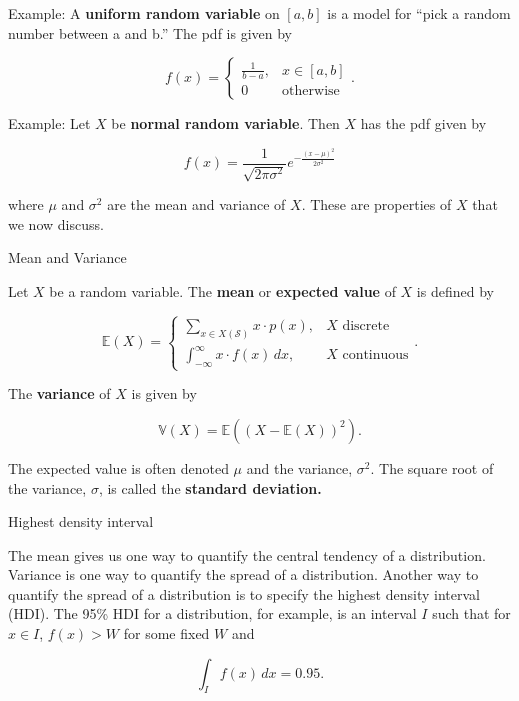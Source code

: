 \documentclass[ignorenonframetext,aspectratio=169]{beamer}
\begin{document}
\begin{frame}{}
\protect\hypertarget{section-1}{}

Example: A \textbf{uniform random variable} on \([a,b]\) is a model for
``pick a random number between a and b.'' The pdf is given by

\[f(x) = 
  \begin{cases} 
    \frac{1}{b-a}, & x\in[a,b] \\ 
    0 & \text{otherwise}
  \end{cases}.
\]

Example: Let \(X\) be \textbf{normal random variable}. Then \(X\) has
the pdf given by

\[f(x) = \frac{1}{\sqrt{2\pi\sigma^2}}e^{-\frac{(x-\mu)^2}{2\sigma^2}}\]

where \(\mu\) and \(\sigma^2\) are the mean and variance of \(X\). These
are properties of \(X\) that we now discuss.

\end{frame}

\begin{frame}{Mean and Variance}
\protect\hypertarget{mean-and-variance}{}

Let \(X\) be a random variable. The \textbf{mean} or \textbf{expected
value} of \(X\) is defined by

\[\mathbb E(X)=
  \begin{cases}
    \displaystyle\sum_{x\in X(\mathcal S)}x\cdot p(x), & X \text{   discrete} \\
    \displaystyle\int_{-\infty}^{\infty}x\cdot f(x)\, dx, & X \text{   continuous}
  \end{cases}
.\]

The \textbf{variance} of \(X\) is given by

\[\mathbb V(X)=\mathbb E\left((X - \mathbb E(X))^2\right).\]

The expected value is often denoted \(\mu\) and the variance,
\(\sigma^2\). The square root of the variance, \(\sigma\), is called the
\textbf{standard deviation.}

\end{frame}

\begin{frame}{Highest density interval}
\protect\hypertarget{highest-density-interval}{}

The mean gives us one way to quantify the central tendency of a
distribution. Variance is one way to quantify the spread of a
distribution. Another way to quantify the spread of a distribution is to
specify the highest density interval (HDI). The 95\% HDI for a
distribution, for example, is an interval \(I\) such that for
\(x\in I\), \(f(x)>W\) for some fixed \(W\) and

\[\int_I f(x)\,dx = 0.95.\]

\end{frame}
\end{document}
